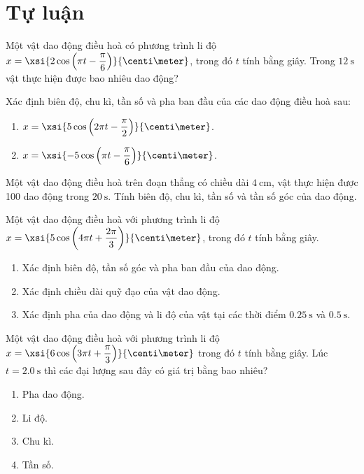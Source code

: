 \section{Tự luận}
\setcounter{ex}{0}
\begin{ex}
	Một vật dao động điều hoà có phương trình li độ $x=\xsi{2\cos\left(\pi t-\dfrac{\pi}{6}\right)}{\centi\meter}$, trong đó $t$ tính bằng giây. Trong $\SI{12}{\second}$ vật thực hiện được bao nhiêu dao động?
\end{ex}
\begin{ex}
Xác định biên độ, chu kì, tần số và pha ban đầu của các dao động điều hoà sau:
\begin{enumerate}[label=\alph*)]
	\item $x=\xsi{5\cos\left(2\pi t-\dfrac{\pi}{2}\right)}{\centi\meter}$.
	\item $x=\xsi{-5\cos\left(\pi t-\dfrac{\pi}{6}\right)}{\centi\meter}$.
\end{enumerate}
	\loigiai{}
\end{ex}
\begin{ex}
	Một vật dao động điều hoà trên đoạn thẳng có chiều dài $\SI{4}{\centi\meter}$, vật thực hiện được 100 dao động trong $\SI{20}{\second}$. Tính biên độ, chu kì, tần số và tần số góc của dao động.
	\loigiai{}
\end{ex}
\begin{ex}
	Một vật dao động điều hoà với phương trình li độ $x=\xsi{5\cos\left(4\pi t+\dfrac{2\pi}{3}\right)}{\centi\meter}$, trong đó $t$ tính bằng giây.
	\begin{enumerate}[label=\alph*)]
		\item Xác định biên độ, tần số góc và pha ban đầu của dao động.
		\item Xác định chiều dài quỹ đạo của vật dao động.
		\item Xác định pha của dao động và li độ của vật tại các thời điểm $\SI{0.25}{\second}$ và $\SI{0.5}{\second}$.
	\end{enumerate}
	\loigiai{}
\end{ex}
\begin{ex}
	Một vật dao động điều hoà với phương trình li độ $x=\xsi{6\cos\left(3\pi t+\dfrac{\pi}{3}\right)}{\centi\meter}$ trong đó $t$ tính bằng giây. Lúc $t=\SI{2.0}{\second}$ thì các đại lượng sau đây có giá trị bằng bao nhiêu?
	\begin{enumerate}[label=\alph*)]
		\item Pha dao động.
		\item Li độ.
		\item Chu kì.
		\item Tần số.
	\end{enumerate}
	\loigiai{}
\end{ex}
